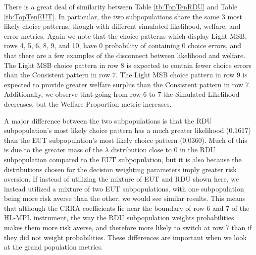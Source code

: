 \documentclass[../main.tex]{subfiles}
\begin{document}
There is a great deal of similarity between Table \ref{tb:TopTenRDU} and Table \ref{tb:TopTenEUT}.
In particular, the two subpopulations share the same $3$ most likely choice patterns, though with different simulated likelihood, welfare, and error metrics.
Again we note that the choice patterns which display Light MSB, rows 4, 5, 6, 8, 9, and 10, have $0$ probability of containing $0$ choice errors, and that there are a few examples of the disconnect between likelihood and welfare.
The Light MSB choice pattern in row 8 is expected to contain fewer choice errors than the Consistent pattern in row 7.
The Light MSB choice pattern in row 9 is expected to provide greater welfare surplus than the Consistent pattern in row 7.
Additionally, we observe that going from row 6 to 7 the Simulated Likelihood decreases, but the Welfare Proportion metric increases.

A major difference between the two subpopulations is that the RDU subpopulation's most likely choice pattern has a much greater likelihood (0.1617) than the EUT subpopulation's most likely choice pattern (0.0360).
Much of this is due to the greater mass of the $\lambda$ distribution close to $0$ in the RDU subpopulation compared to the EUT subpopulation, but it is also because the distributions chosen for the decision weighting parameters imply greater risk aversion.
If instead of utilizing the mixture of EUT and RDU shown here, we instead utilized a mixture of two EUT subpopulations, with one subpopulation being more risk averse than the other, we would see similar results.
This means that although the CRRA coefficients lie near the boundary of row 6 and 7 of the HL-MPL instrument, the way the RDU subpopulation weights probabilities makes them more risk averse, and therefore more likely to switch at row 7 than if they did not weight probabilities.
These differences are important when we look at the grand population metrics.
\end{document}
